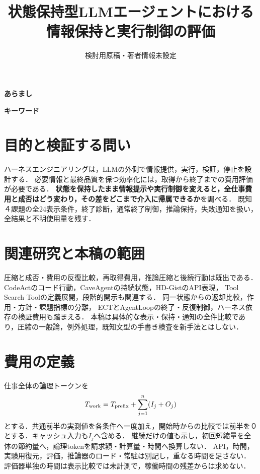 \documentclass[uplatex,a4paper,twocolumn,10pt]{jsarticle}
\title{状態保持型LLMエージェントにおける\newline 情報保持と実行制御の評価}
\author{検討用原稿・著者情報未設定}
\date{}
\begin{document}
\raggedbottom
\maketitle
\noindent\textbf{あらまし}\quad


\noindent\textbf{キーワード}\quad\LetterJapaneseKeywords

\section{目的と検証する問い}
ハーネスエンジニアリングは，LLMの外側で情報提供，実行，検証，停止を設計する．
必要情報と最終品質を保つ効率化には，取得から終了までの費用評価が必要である．
\textbf{状態を保持したまま情報提示や実行制御を変えると，全仕事費用と成否はどう変わり，その差をどこまで介入に帰属できるか}を調べる．
既知４課題の全24表示条件，終了診断，通常終了制御，推論保持，失敗通知を扱い，全結果と不明使用量を残す．

\section{関連研究と本稿の範囲}
圧縮と成否・費用の反復比較\cite{beyond}，再取得費用\cite{interaction}，推論圧縮と後続行動\cite{thinking}は既出である．
CodeAct\cite{codeact}のコード行動，CaveAgent\cite{cave}の持続状態，HD-Gist\cite{hdgist}のAPI表現，
Tool Search Tool\cite{toolsearch}の定義展開，段階的開示\cite{disclosure}も関連する．
同一状態からの返却比較\cite{evidence}，作用・方針・課題指標の分離\cite{matoi}，
ECT\cite{ect}とAgentLoop\cite{agentloop}の終了・反復制御，ハーネス依存の検証費用\cite{waste}も踏まえる．
本稿は具体的な表示・保持・通知の全件比較であり，圧縮の一般論，例外処理，既知文型の手書き検査を新手法とはしない．

\section{費用の定義}
仕事全体の論理トークンを
\begin{equation}
 T_{\rm work}=T_{\rm prefix}+\sum_{j=1}^{n}(I_j+O_j)
\end{equation}
とする．共通前半の実測値を各条件へ一度加え，開始時からの比較では前半を０とする．キャッシュ入力も$I_j$へ含める．
継続だけの値も示し，初回短縮量を全体の節約量へ，論理tokenを請求額・計算量・時間へ換算しない．
API，時間，実験用復元，評価，推論器のロード・常駐は別記し，重なる時間を足さない．
評価器単独の時間は表示比較では未計測で，稼働時間の残差からは求めない．
\end{document}
